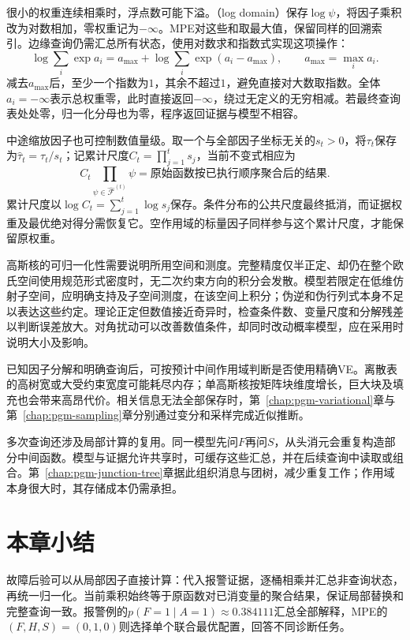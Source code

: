 很小的权重连续相乘时，浮点数可能下溢。（log domain）保存$\log\psi$，将因子乘积改为对数相加，零权重记为$-\infty$。MPE对这些和取最大值，保留同样的回溯索引。边缘查询仍需汇总所有状态，使用对数求和指数式实现这项操作：
\begin{equation}
  \log\sum_i\exp a_i
  =a_{\max}+\log\sum_i\exp(a_i-a_{\max}),
  \qquad a_{\max}=\max_i a_i.
  \label{eq:pgm-elimination-logsumexp}
\end{equation}
减去$a_{\max}$后，至少一个指数为$1$，其余不超过$1$，避免直接对大数取指数。全体$a_i=-\infty$表示总权重零，此时直接返回$-\infty$，绕过无定义的无穷相减。若最终查询表处处零，归一化分母也为零，程序返回证据与模型不相容。

中途缩放因子也可控制数值量级。取一个与全部因子坐标无关的$s_t>0$，将$\tau_t$保存为$\widehat{\tau}_t=\tau_t/s_t$；记累计尺度$C_t=\prod_{j=1}^t s_j$，当前不变式相应为
\[
  C_t\prod_{\psi\in\widehat{\mathcal{F}}^{(t)}}\psi
  =\text{原始函数按已执行顺序聚合后的结果}.
\]
累计尺度以$\log C_t=\sum_{j=1}^t\log s_j$保存。条件分布的公共尺度最终抵消，而证据权重及最优绝对得分需恢复它。空作用域的标量因子同样参与这个累计尺度，才能保留原权重。

高斯核的可归一化性需要说明所用空间和测度。完整精度仅半正定、却仍在整个欧氏空间使用规范形式密度时，无二次约束方向的积分会发散。模型若限定在低维仿射子空间，应明确支持及子空间测度，在该空间上积分；伪逆和伪行列式本身不足以表达这些约定。理论正定但数值接近奇异时，检查条件数、变量尺度和分解残差以判断误差放大。对角扰动可以改善数值条件，却同时改动概率模型，应在采用时说明大小及影响。

已知因子分解和明确查询后，可按预计中间作用域判断是否使用精确VE。离散表的高树宽或大受约束宽度可能耗尽内存；单高斯核按矩阵块维度增长，巨大块及填充也会带来高昂代价。相关信息无法全部保存时，第~\ref{chap:pgm-variational}章与第~\ref{chap:pgm-sampling}章分别通过变分和采样完成近似推断。

多次查询还涉及局部计算的复用。同一模型先问$F$再问$S$，从头消元会重复构造部分中间函数。模型与证据允许共享时，可缓存这些汇总，并在后续查询中读取或组合。第~\ref{chap:pgm-junction-tree}章据此组织消息与团树，减少重复工作；作用域本身很大时，其存储成本仍需承担。

\section{本章小结}
\label{sec:pgm-elimination-summary}

故障后验可以从局部因子直接计算：代入报警证据，逐桶相乘并汇总非查询状态，再统一归一化。当前乘积始终等于原函数对已消变量的聚合结果，保证局部替换和完整查询一致。报警例的$p(F=1\mid A=1)\approx0.384111$汇总全部解释，MPE的$(F,H,S)=(0,1,0)$则选择单个联合最优配置，回答不同诊断任务。

